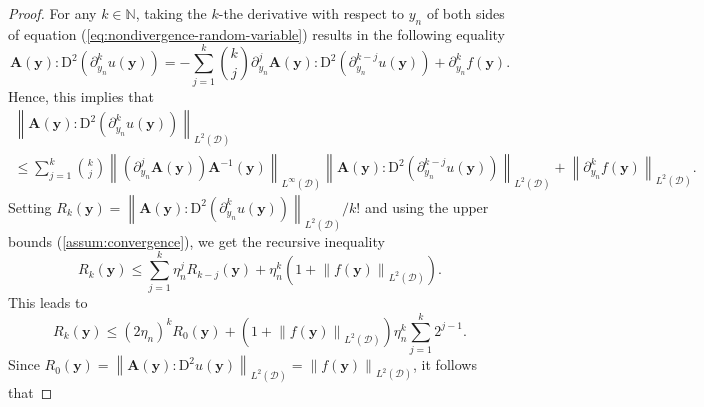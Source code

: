 \documentclass[final,onefignum,onetabnum]{mousaviart}
\begin{document}
		\vspace*{1mm}
		\begin{proof}
			For any $k \in \mathbb{N}$, taking the $k$-the derivative with respect to $y_n$ of both sides of equation (\ref{eq:nondivergence-random-variable}) results in the following equality
			\begin{equation*}
				\boldsymbol{A}(\boldsymbol{y}): \mathrm{D}^2\left( \partial_{y_n}^k u(\boldsymbol{y}) \right) 
				= 
				- \sum_{j = 1}^{k} \binom{k}{j} \partial_{y_n}^j \boldsymbol{A}(\boldsymbol{y}) : \mathrm{D}^2\left( \partial_{y_n}^{k-j} u(\boldsymbol{y}) \right) 
				+
				\partial_{y_n}^kf(\boldsymbol{y}).
			\end{equation*}
			Hence, this implies that
			\begin{multline*}
				\left\| 
				\boldsymbol{A}(\boldsymbol{y}): \mathrm{D}^2\left( \partial_{y_n}^k u(\boldsymbol{y}) \right)
				\right\|_{L^2(\mathcal{D})} 
				\\
				\leq
				\sum_{j = 1}^{k} \binom{k}{j}
				\left\| 
				\left( \partial_{y_n}^j \boldsymbol{A}(\boldsymbol{y}) \right)  \boldsymbol{A}^{-1}(\boldsymbol{y}) 
				\right\|_{L^\infty(\mathcal{D})} 
				\left\| 
				\boldsymbol{A}(\boldsymbol{y}): \mathrm{D}^2\left( \partial_{y_n}^{k-j} u(\boldsymbol{y}) \right) 
				\right\|_{L^2(\mathcal{D})} 
				+
				\left\| 
				\partial_{y_n}^kf(\boldsymbol{y})
				\right\|_{L^2(\mathcal{D})}.  
			\end{multline*}
			Setting $R_k(\boldsymbol{y}) = {\left\| \boldsymbol{A}(\boldsymbol{y}): \mathrm{D}^2\left( \partial_{y_n}^k u(\boldsymbol{y}) \right) \right\|_{L^2(\mathcal{D})}}/{k!} $ and using the upper bounds (\ref{assum:convergence}), we get the recursive inequality 
			\begin{equation*}
				R_k(\boldsymbol{y}) \leq \sum_{j=1}^{k} \eta_n^j R_{k-j}(\boldsymbol{y}) + \eta_n^k\left( 1+ \left\| f(\boldsymbol{y}) \right\|_{L^2(\mathcal{D})}  \right). 
			\end{equation*}
			This leads to 
			\begin{equation*}
				R_k (\boldsymbol{y}) \leq \left( 2\eta_n \right) ^k R_0 (\boldsymbol{y}) + \left( 1+ \left\| f(\boldsymbol{y}) \right\|_{L^2(\mathcal{D})}  \right) \eta_n^k \sum_{j=1}^{k}2^{j-1}. 
			\end{equation*} 
			Since $R_0(\boldsymbol{y}) =\left\| \boldsymbol{A}(\boldsymbol{y}) : \mathrm{D}^2u(\boldsymbol{y}) \right\|_{L^2(\mathcal{D})} = \left\| f(\boldsymbol{y}) \right\|_{L^2(\mathcal{D})}$, it follows that

\end{proof}
\end{document}
